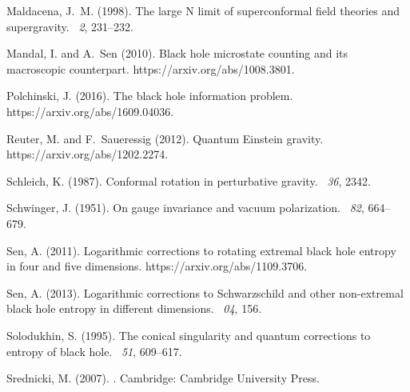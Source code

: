 \documentclass{article}
\begin{document}
\begin{thebibliography}{}
Maldacena, J.~M. (1998).
\newblock The large {N} limit of superconformal field theories and
  supergravity.
~{\em 2},
  231--232.

Mandal, I. and A.~Sen (2010).
\newblock Black hole microstate counting and its macroscopic counterpart.
\newblock https://arxiv.org/abs/1008.3801.

Polchinski, J. (2016).
\newblock The black hole information problem.
\newblock https://arxiv.org/abs/1609.04036.

Reuter, M. and F.~Saueressig (2012).
\newblock Quantum {E}instein gravity.
\newblock https://arxiv.org/abs/1202.2274.

Schleich, K. (1987).
\newblock Conformal rotation in perturbative gravity.
~{\em 36}, 2342.

Schwinger, J. (1951).
\newblock On gauge invariance and vacuum polarization.
~{\em 82}, 664--679.

Sen, A. (2011).
\newblock Logarithmic corrections to rotating extremal black hole entropy in
  four and five dimensions.
\newblock https://arxiv.org/abs/1109.3706.

Sen, A. (2013).
\newblock Logarithmic corrections to {S}chwarzschild and other non-extremal
  black hole entropy in different dimensions.
~{\em 04}, 156.

Solodukhin, S. (1995).
\newblock The conical singularity and quantum corrections to entropy of black
  hole.
~{\em 51}, 609--617.

Srednicki, M. (2007).
.
\newblock Cambridge: Cambridge University Press.


\end{thebibliography}
\end{document}
